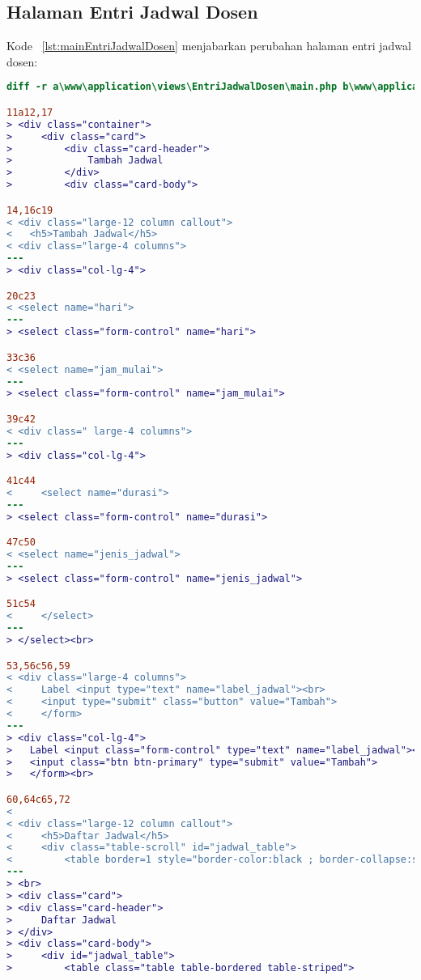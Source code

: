 \subsection{Halaman Entri Jadwal Dosen}
Kode ~\ref{lst:mainEntriJadwalDosen} menjabarkan perubahan halaman entri jadwal dosen:
\begin{lstlisting}[language=diff, caption=Kode untuk Halaman Entri Jadwal Dosen,  basicstyle=\ttfamily, frame=single,
columns=fullflexible, keepspaces=true, breaklines=true, label={lst:mainEntriJadwalDosen}]
diff -r a\www\application\views\EntriJadwalDosen\main.php b\www\application\views\EntriJadwalDosen\main.php

11a12,17
> <div class="container">
>     <div class="card">
>         <div class="card-header">
>             Tambah Jadwal
>         </div>
>         <div class="card-body">

14,16c19
< <div class="large-12 column callout">
< 	<h5>Tambah Jadwal</h5>
< <div class="large-4 columns">
---
> <div class="col-lg-4">

20c23
< <select name="hari"> 
---
> <select class="form-control" name="hari">

33c36
< <select name="jam_mulai"> 
---
> <select class="form-control" name="jam_mulai">

39c42
< <div class=" large-4 columns">
---
> <div class="col-lg-4">

41c44
<     <select name="durasi"> 
---
> <select class="form-control" name="durasi">

47c50
< <select name="jenis_jadwal"> 
---
> <select class="form-control" name="jenis_jadwal">

51c54
<     </select>
---
> </select><br>

53,56c56,59
< <div class="large-4 columns">
<     Label <input type="text" name="label_jadwal"><br>
<     <input type="submit" class="button" value="Tambah">
<     </form>
---
> <div class="col-lg-4">
> 	Label <input class="form-control" type="text" name="label_jadwal"><br><br>
> 	<input class="btn btn-primary" type="submit" value="Tambah">
> 	</form><br>

60,64c65,72
< 
< <div class="large-12 column callout">
<     <h5>Daftar Jadwal</h5>
<     <div class="table-scroll" id="jadwal_table">
<         <table border=1 style="border-color:black ; border-collapse:separate">
---
> <br>
> <div class="card">
> <div class="card-header">
>     Daftar Jadwal
> </div>
> <div class="card-body">
>     <div id="jadwal_table">
>         <table class="table table-bordered table-striped">


\end{lstlisting}
